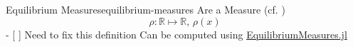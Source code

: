 \begin{definition}{Equilibrium Measures}{equilibrium-measures}
  Are a Measure (cf. )
  \[\rho: \mathbb{R} \mapsto \mathbb{R},\, \rho(x)\] - {[} {]} Need to fix
  this definition Can be computed using
  \href{https://github.com/JuliaApproximation/EquilibriumMeasures.jl}{EquilibriumMeasures.jl}
\end{definition}
